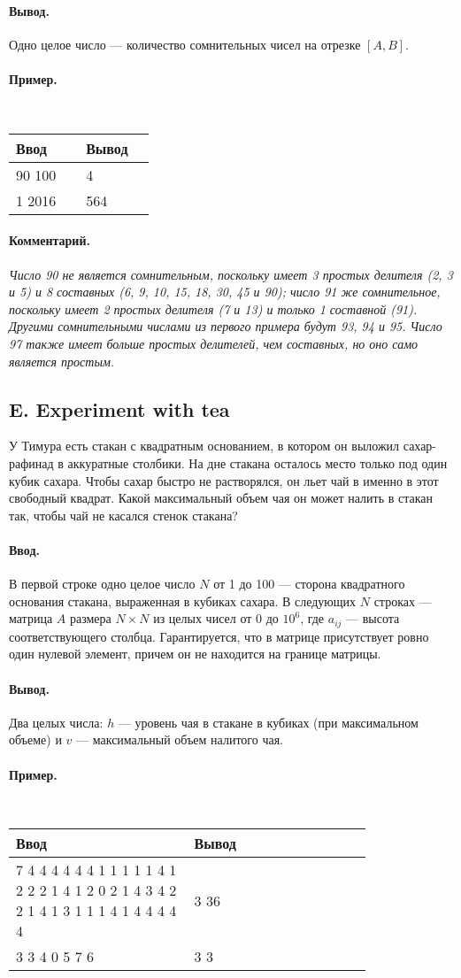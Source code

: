 \documentclass[12pt, a4paper]{article}
\newcommand{\informat}[1]
{
	\paragraph{Ввод.\\} #1
}
\newcommand{\outformat}[1]
{
	\paragraph{Вывод.\\} #1
}
\newcommand{\examplee}[4]
{
	\paragraph{Пример.\\}
	{\tt
	\begin{tabular}{|p{0.4\linewidth}|p{0.4\linewidth}|}
	\hline
	Ввод 	& Вывод  	\\
	\hline
	#1 		& #2 		\\
	\hline
	#3		& #4		\\
	\hline
	\end{tabular}
	}
}
\newcommand{\excomm}[1]
{
	\paragraph{Комментарий. \\}
	\textit{#1}
}
\begin{document}
\outformat{Одно целое число --- количество сомнительных чисел на отрезке $[A, B]$.}

\examplee{90 100}{4}{1 2016}{564}

\excomm{Число 90 не является сомнительным, поскольку имеет 3 простых делителя (2, 3 и 5) и 8 составных (6, 9, 10, 15, 18, 30, 45 и 90); число 91 же сомнительное, поскольку имеет 2 простых делителя (7 и 13) и только 1 составной (91). Другими сомнительными числами из первого примера будут 93, 94 и 95. Число 97 также имеет больше простых делителей, чем составных, но оно само является простым.}



\subsection*{E. Experiment with tea}

У Тимура есть стакан с квадратным основанием, в котором он выложил сахар-рафинад в аккуратные столбики. На дне стакана осталось место только под один кубик сахара. Чтобы сахар быстро не растворялся, он льет чай в именно в этот свободный квадрат. Какой максимальный объем чая он может налить в стакан так, чтобы чай не касался стенок стакана?



\informat{В первой строке одно целое число $N$ от 1 до 100 --- сторона квадратного основания стакана, выраженная в кубиках сахара. \newline
В следующих $N$ строках ---  матрица $A$ размера $N \times N$ из целых чисел от 0 до $10^6$, где $a_{ij}$ --- высота соответствующего столбца. Гарантируется, что в матрице присутствует ровно один нулевой элемент, причем он не находится на границе матрицы.}

\outformat{Два целых числа: $h$ --- уровень чая в стакане в кубиках (при максимальном объеме) и $v$ --- максимальный объем налитого чая.}

\examplee{7 \newline
4 4 4 4 4 4 4  \newline
4 1 1 1 1 1 4  \newline
4 1 2 2 2 1 4  \newline
4 1 2 0 2 1 4  \newline
4 3 4 2 2 1 4  \newline
1 1 3 1 1 1 4  \newline
1 1 4 4 4 4 4}{3 36}
{3 \newline
2 3 4 \newline
9 0 5 \newline
8 7 6}{3 3}
\end{document}
